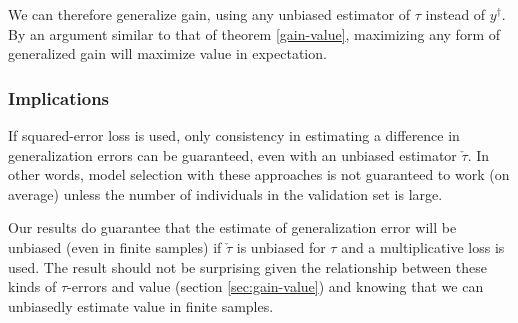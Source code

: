 We can therefore generalize gain, using any unbiased estimator of $\tau$ instead of $y^{\dagger}$. By an argument similar to that of theorem \ref{gain-value}, maximizing any form of generalized gain will maximize value in expectation.

\subsubsection{Implications}

If squared-error loss is used, only consistency in estimating a difference in generalization errors can be guaranteed, even with an unbiased estimator $\check\tau$. In other words, model selection with these approaches is not guaranteed to work (on average) unless the number of individuals in the validation set is large.

Our results do guarantee that the estimate of generalization error will be unbiased (even in finite samples) if $\check\tau$ is unbiased for $\tau$ and a multiplicative loss is used. The result should not be surprising given the relationship between these kinds of $\tau$-errors and value (section \ref{sec:gain-value}) and knowing that we can unbiasedly estimate value in finite samples. 

